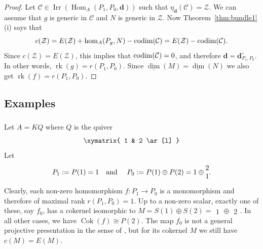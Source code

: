 \documentclass[12pt,reqno]{amsart}
\theoremstyle{definition}
\newcommand{\df}{\colon}
\newcommand{\cC}{{\mathcal C}}
\newcommand{\bd}{\mathbf{d}}
\newcommand{\rk}{\operatorname{rk}}
\newcommand{\dimv}{\underline{\dim}}
\newcommand{\Hom}{\operatorname{Hom}}
\newcommand{\Coker}{\operatorname{Cok}}
\newcommand{\irr}{\operatorname{Irr}}
\newcommand{\bbm}{\begin{matrix}}
\newcommand{\ebm}{\end{matrix}}
\newcommand{\calZ}{\mathcal{Z}}
\begin{document}
\begin{proof}
Let $\cC \in \irr(\Hom_A(P_1,P_0,\bd))$ such that
$\eta_\bd(\cC) = \calZ$.
We can assume that $g$ is generic in $\cC$ and $N$ is generic in
$\calZ$.
Now Theorem~\ref{thm:bundle1}(i) says that
$$
c(\calZ) = E(\calZ) + \hom_A(P_g,N) - {\rm codim}(\cC)
= E(\calZ) - {\rm codim}(\cC).
$$
Since $c(\calZ) = E(\calZ)$,
this implies that ${\rm codim}(\cC) = 0$, and therefore
$\bd = \bd_{P_1,P_0}^\circ$.
In other words, $\rk(g) = r(P_1,P_0)$.
Since $\dimv(M) = \dimv(N)$ we also get $\rk(f) = r(P_1,P_0)$.
\end{proof}



\subsection{Examples}

\subsubsection{}
Let $A = KQ$ where $Q$ is the quiver
$$
\xymatrix{
1 & 2 \ar[l]
}
$$
Let
$$
P_1 := P(1) = \bbm 1 \ebm
\text{\quad and \quad}
P_0 := P(1) \oplus P(2) = \bbm 1 \ebm \oplus \bbm 2\\1 \ebm.
$$
Clearly, each non-zero homomorphism $f\df P_1 \to P_0$ is
a monomorphism and therefore of maximal rank $r(P_1,P_0) = 1$.
Up to a non-zero scalar, exactly one of these, say $f_0$, has a cokernel isomorphic to
$M = S(1) \oplus S(2) = \bbm 1 \ebm \oplus \bbm 2 \ebm$.
In all other cases, we have $\Coker(f) \cong P(2)$.
The map $f_0$ is not a general projective presentation in the sense of \cite{DF15}, but for
its cokernel $M$ we still have $c(M) = E(M)$.


\end{document}
